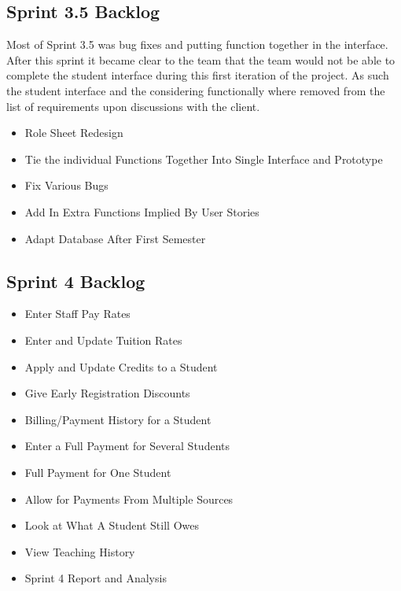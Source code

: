 \subsection{Sprint 3.5 Backlog}
Most of Sprint 3.5 was bug fixes and putting function together in the interface. After this sprint it became clear to the team that the team would not be able to complete the student interface during this first iteration of the project. As such the student interface and the considering functionally where removed from the list of requirements upon discussions with the client.

\begin{itemize}
\item Role Sheet Redesign 
\item Tie the individual Functions Together Into Single Interface and Prototype 
\item Fix Various Bugs
\item Add In Extra Functions Implied By User Stories
\item Adapt Database After First Semester 
\end{itemize}

\subsection{Sprint 4 Backlog}
\begin{itemize}
\item Enter Staff Pay Rates
\item Enter and Update Tuition Rates
\item Apply and Update Credits to a Student
\item Give Early Registration Discounts
\item Billing/Payment History for a Student
\item Enter a Full Payment for Several Students
\item Full Payment for One Student
\item Allow for Payments From Multiple Sources 
\item Look at What A Student Still Owes
\item View Teaching History
\item Sprint 4 Report and Analysis 
\end{itemize}

